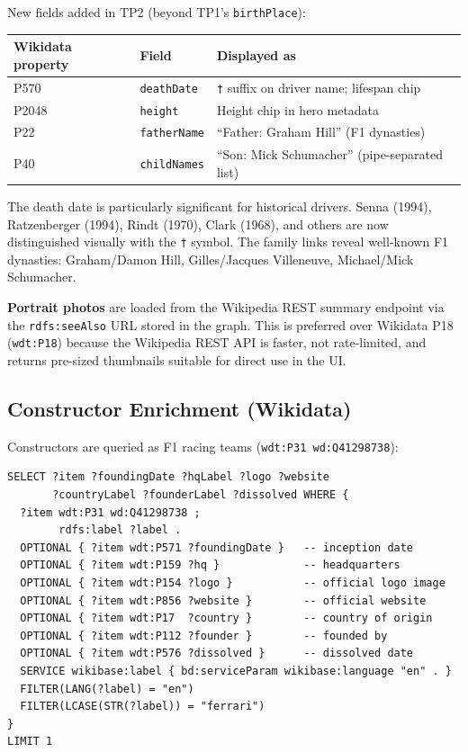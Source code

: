 \documentclass[12pt,a4paper]{article}
\begin{document}
New fields added in TP2 (beyond TP1's \texttt{birthPlace}):

\begin{center}
\begin{tabular}{@{}lll@{}}
\toprule
\textbf{Wikidata property} & \textbf{Field} & \textbf{Displayed as} \\
\midrule
P570 & \texttt{deathDate} & \texttt{†} suffix on driver name; lifespan chip \\
P2048 & \texttt{height} & Height chip in hero metadata \\
P22 & \texttt{fatherName} & ``Father: Graham Hill'' (F1 dynasties) \\
P40 & \texttt{childNames} & ``Son: Mick Schumacher'' (pipe-separated list) \\
\bottomrule
\end{tabular}
\end{center}

The death date is particularly significant for historical drivers. Senna (1994),
Ratzenberger (1994), Rindt (1970), Clark (1968), and others are now distinguished
visually with the \texttt{†} symbol. The family links reveal well-known F1 dynasties:
Graham/Damon Hill, Gilles/Jacques Villeneuve, Michael/Mick Schumacher.

\textbf{Portrait photos} are loaded from the Wikipedia REST summary endpoint via the \texttt{rdfs:seeAlso}
URL stored in the graph. This is preferred over Wikidata P18 (\texttt{wdt:P18})
because the Wikipedia REST API is faster, not rate-limited, and returns
pre-sized thumbnails suitable for direct use in the UI.

\subsection{Constructor Enrichment (Wikidata)}

Constructors are queried as F1 racing teams (\texttt{wdt:P31 wd:Q41298738}):

\begin{lstlisting}[style=sparql, caption={Wikidata query for constructor enrichment}]
SELECT ?item ?foundingDate ?hqLabel ?logo ?website
       ?countryLabel ?founderLabel ?dissolved WHERE {
  ?item wdt:P31 wd:Q41298738 ;
        rdfs:label ?label .
  OPTIONAL { ?item wdt:P571 ?foundingDate }   -- inception date
  OPTIONAL { ?item wdt:P159 ?hq }             -- headquarters
  OPTIONAL { ?item wdt:P154 ?logo }           -- official logo image
  OPTIONAL { ?item wdt:P856 ?website }        -- official website
  OPTIONAL { ?item wdt:P17  ?country }        -- country of origin
  OPTIONAL { ?item wdt:P112 ?founder }        -- founded by
  OPTIONAL { ?item wdt:P576 ?dissolved }      -- dissolved date
  SERVICE wikibase:label { bd:serviceParam wikibase:language "en" . }
  FILTER(LANG(?label) = "en")
  FILTER(LCASE(STR(?label)) = "ferrari")
}
LIMIT 1
\end{lstlisting}
\end{document}
